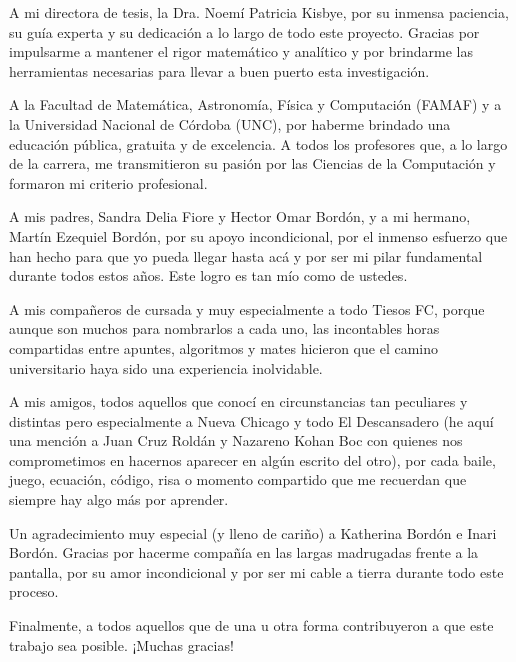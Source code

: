A mi directora de tesis, la Dra. Noemí Patricia Kisbye, por su inmensa paciencia, su guía experta y su dedicación a lo largo de todo este proyecto. Gracias por impulsarme a mantener el rigor matemático y analítico y por brindarme las herramientas necesarias para llevar a buen puerto esta investigación.

A la Facultad de Matemática, Astronomía, Física y Computación (FAMAF) y a la Universidad Nacional de Córdoba (UNC), por haberme brindado una educación pública, gratuita y de excelencia. A todos los profesores que, a lo largo de la carrera, me transmitieron su pasión por las Ciencias de la Computación y formaron mi criterio profesional.

A mis padres, Sandra Delia Fiore y Hector Omar Bordón, y a mi hermano, Martín Ezequiel Bordón, por su apoyo incondicional, por el inmenso esfuerzo que han hecho para que yo pueda llegar hasta acá y por ser mi pilar fundamental durante todos estos años. Este logro es tan mío como de ustedes.

A mis compañeros de cursada y muy especialmente a todo Tiesos FC, porque aunque son muchos para nombrarlos a cada uno, las incontables horas compartidas entre apuntes, algoritmos y mates hicieron que el camino universitario haya sido una experiencia inolvidable.

A mis amigos, todos aquellos que conocí en circunstancias tan peculiares y distintas pero especialmente a Nueva Chicago y todo El Descansadero (he aquí una mención a Juan Cruz Roldán y Nazareno Kohan Boc con quienes nos comprometimos en hacernos aparecer en algún escrito del otro), por cada baile, juego, ecuación, código, risa o momento compartido que me recuerdan que siempre hay algo más por aprender.

Un agradecimiento muy especial (y lleno de cariño) a Katherina Bordón e Inari Bordón. Gracias por hacerme compañía en las largas madrugadas frente a la pantalla, por su amor incondicional y por ser mi cable a tierra durante todo este proceso.

Finalmente, a todos aquellos que de una u otra forma contribuyeron a que este trabajo sea posible. ¡Muchas gracias!
